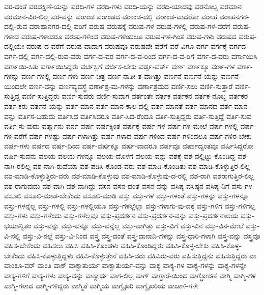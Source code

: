 {ವರ-ದಂತೆ
ವರದಕ್ಷಿಣೆ-ಯನ್ನು
ವರದಿ-ಗಳ
ವರದಿ-ಗಳು
ವರದಿ-ಯನ್ನು
ವರದಿ-ಯಾದವು
ವರನೊಬ್ಬ
ವರಮಾನ
ವರಮಾನ-ವಿರ-ಲಿಲ್ಲ
ವರ-ವನ್ನು
ವರಾಂಡ
ವರಾಂಡದ
ವರಾಂಡ-ದಲ್ಲಿ
ವರಾಂಡ-ವಾದರೋ
ವರಾಹ
ವರಾಹನಗರ-ದಲ್ಲಿ-ರುವ
ವರಾಹಾನಗರ-ದಲ್ಲಿ
ವರಿಗೆ
ವರುಷ
ವರುಷಕ್ಕೆ
ವರುಷ-ಗಳ
ವರುಷ-ಗಳಲ್ಲಿ
ವರುಷ-ಗಳ-ವರೆಗೆ
ವರುಷ-ಗಳಾದ
ವರುಷ-ಗಳಾದರೂ
ವರುಷ-ಗಳಿಂದ
ವರುಷ-ಗಳಿಂದಲೂ
ವರುಷ-ಗಳಿ-ಗಿಂತ
ವರುಷ-ಗಳು
ವರುಷದ
ವರುಷ-ದಲ್ಲಿಯೇ
ವರುಷ-ದ-ವರೆಗೆ
ವರುಷ-ವಾದಾಗ
ವರುಷವೂ
ವರುಷವೇ
ವರೆಗೆ
ವರೆ-ವಿಗೂ
ವರ್ಗ
ವರ್ಗಕ್ಕೆ
ವರ್ಗದ
ವರ್ಗ-ದಲ್ಲಿ
ವರ್ಗ-ದಲ್ಲಿ-ರುವ-ವರು
ವರ್ಗ-ದ-ವರ
ವರ್ಗ-ದ-ವ-ರಿಂದ
ವರ್ಗ-ದ-ವ-ರಿಗೆ
ವರ್ಗ-ದ-ವರು
ವರ್ಗಾಯಿಸಿ
ವರ್ಗಾಯಿ-ಸಿತು
ವರ್ಗಾಯಿಸಿದ್ದರು
ವರ್ಚಸ್ಸಿಗೆ
ವರ್ಜಿಸ-ಬೇಕು
ವರ್ಡ್ಸ-ವರ್ತ್
ವರ್ಣ
ವರ್ಣಕ್ಕೂ
ವರ್ಣ-ಗಳ
ವರ್ಣ-ಗಳನ್ನು
ವರ್ಣ-ಗಳಲ್ಲಿ
ವರ್ಣ-ಗಳು
ವರ್ಣ-ಚಿತ್ರ
ವರ್ಣ-ನಾತೀ-ತ-ವಾಗಿತ್ತು
ವರ್ಣನೆ
ವರ್ಣನೆ-ಯನ್ನು
ವರ್ಣನೆ-ಯಿಂದಲೇ
ವರ್ಣ-ವನ್ನು
ವರ್ಣವ್ಯವಸ್ಥೆ
ವರ್ಣಾಶ್ರ-ಮ-ಗಳನ್ನು
ವರ್ಣಾಶ್ರಮದ
ವರ್ಣಿ-ಸಲು
ವರ್ಣಿ-ಸುತ್ತಾರೆ
ವರ್ಣಿ-ಸುತ್ತಿದ್ದ
ವರ್ಣಿ-ಸುತ್ತಿದ್ದರು
ವರ್ಣಿ-ಸುವರು
ವರ್ಣಿ-ಸುವಾಗ
ವರ್ತಂತೇ
ವರ್ತಕ
ವರ್ತಕನ
ವರ್ತಕ-ನೊಬ್ಬ
ವರ್ತಕರ
ವರ್ತ-ಕರು
ವರ್ತನೆ-ಯನ್ನು
ವರ್ತ-ಮಾನ
ವರ್ತ-ಮಾನ-ಕಾಲ-ದಲ್ಲಿ
ವರ್ತ-ಮಾನತೆ
ವರ್ತ-ಮಾನದ
ವರ್ತ-ಮಾನ-ವನ್ನು
ವರ್ತಿಸ-ಬಹುದು
ವರ್ತಿಸಿದ
ವರ್ತಿಸಿದರೂ
ವರ್ತಿ-ಸಿದ-ರೆಂದೂ
ವರ್ತಿ-ಸುತ್ತಿದ್ದರು
ವರ್ತಿ-ಸುತ್ತಿದ್ದೆ
ವರ್ತಿ-ಸುವ
ವರ್ತಿ-ಸು-ವುದು
ವರ್ತ್ಮಾನು
ವರ್ನ
ವರ್ಷ
ವರ್ಷಕ್ಕಿಂತ
ವರ್ಷಕ್ಕೆ
ವರ್ಷ-ಗಳ
ವರ್ಷ-ಗಳ-ಮೇಲೆ
ವರ್ಷ-ಗಳಲ್ಲಿ
ವರ್ಷ-ಗಳ-ವರೆಗೆ
ವರ್ಷ-ಗಳಷ್ಟು
ವರ್ಷ-ಗಳಾಗಿತ್ತು
ವರ್ಷ-ಗಳಾದ
ವರ್ಷ-ಗಳಿಂದ
ವರ್ಷ-ಗಳಿಂದಲೂ
ವರ್ಷ-ಗಳಿರ-ಬೇಕು
ವರ್ಷ-ಗಳು
ವರ್ಷದ
ವರ್ಷ-ದಿಂದ
ವರ್ಷ-ವರ್ಷಕ್ಕೂ
ವರ್ಷ-ವಾದರೂ
ವರ್ಷವೂ
ವರ್ಷಾದ್ಯಂತವೂ
ವರ್ಷಿಸಿದ್ದರೋ
ವರ್ಷಿ-ಸುವನು
ವಲಯ
ವಲಯ-ಗಳನ್ನೂ
ವಲಯ-ದೊಳಗೆ
ವಲಯ-ವನ್ನು
ವಶಕ್ಕೆ
ವಶ-ದಲ್ಲಿಟ್ಟು-ಕೊಂಡಿದ್ದ
ವಶ-ನಾಗಿ-ರಲಿಲ್ಲ
ವಶ-ನಾಗಿ-ರುವೆಯಾ
ವಶ-ಪಡಿಸಿ-ಕೊಂಡ-ವರು
ವಶ-ಮಾಡಿ-ಕೊಂಡಿತು
ವಶ-ಮಾಡಿ-ಕೊಳ್ಳುತ್ತಿರ-ಲಿಲ್ಲ
ವಶ-ಮಾಡಿ-ಕೊಳ್ಳುತ್ತಿರು-ವರು
ವಶ-ಮಾಡಿ-ಕೊಳ್ಳುವು
ವಶ-ಮಾಡಿ-ಕೊಳ್ಳುವು-ದ-ರಲ್ಲಿ
ವಶ-ರಾಗಿ
ವಶರಾಗುತ್ತಿರ-ಲಿಲ್ಲ
ವಶ-ರಾಗುವುದು
ವಶ-ವಾಗಿ
ವಶ-ವಾಗಿದ್ದು
ವಸನ
ವಸನ-ದಂತೆ
ವಸನ-ವನ್ನು
ವಸಿಷ್ಠ
ವಸಿಷ್ಠನ
ವಸಿಷ್ಠ-ನಿಗೆ
ವಸು-ಗಳ
ವಸೂಲಿ
ವಸೂಲಿ-ಮಾಡ-ಬೇಕೆಂದು
ವಸೂಲಿ-ಮಾಡಿ
ವಸ್ತು
ವಸ್ತು-ಗಳ
ವಸ್ತು-ಗಳಂತೆ
ವಸ್ತು-ಗಳನ್ನು
ವಸ್ತು-ಗಳನ್ನೂ
ವಸ್ತು-ಗಳನ್ನೆಲ್ಲ
ವಸ್ತು-ಗಳಲ್ಲಿ
ವಸ್ತು-ಗಳಲ್ಲಿಯೂ
ವಸ್ತು-ಗಳಲ್ಲೆಲ್ಲಾ
ವಸ್ತು-ಗಳಾಗು-ವು-ದಕ್ಕೆ
ವಸ್ತು-ಗಳಿಗೆ
ವಸ್ತು-ಗಳಿಗೆಲ್ಲ
ವಸ್ತು-ಗಳು
ವಸ್ತು-ಗಳೆಂದು
ವಸ್ತು-ಗಳೆಲ್ಲವೂ
ವಸ್ತು-ಪ್ರದರ್ಶನ
ವಸ್ತು-ಪ್ರದರ್ಶನ-ವನ್ನು
ವಸ್ತು-ಪ್ರದರ್ಶನಾಲಯ
ವಸ್ತು-ಭಯಾನ್ವಿತಂ
ವಸ್ತು-ವನ್ನು
ವಸ್ತು-ವನ್ನೂ
ವಸ್ತು-ವನ್ನೆಲ್ಲ
ವಸ್ತು-ವಾಗಿತ್ತು
ವಸ್ತು-ವಿಗೆ
ವಸ್ತು-ವಿನ
ವಸ್ತು-ವಿನ-ಮೇಲೆ
ವಸ್ತು-ವಿ-ನಲ್ಲಿ
ವಸ್ತು-ವಿ-ನಲ್ಲೆ
ವಸ್ತು-ವಿ-ನಿಂದ
ವಸ್ತ್ರ
ವಸ್ತ್ರ-ದಂತೆ
ವಸ್ತ್ರ-ದಾನಾದಿ-ಗಳನ್ನು
ವಸ್ತ್ರ-ಧಾರಿ-ಗಳಾಗಿ
ವಸ್ತ್ರ-ವನ್ನು
ವಸ್ತ್ರವೂ
ವಹಿಸ-ಬೇಕೆಂದು
ವಹಿಸಲು
ವಹಿಸಿ
ವಹಿಸಿ-ಕೊಂಡಳು
ವಹಿಸಿ-ಕೊಂಡಿದ್ದರು
ವಹಿಸಿ-ಕೊಳ್ಳ-ಬೇಕು
ವಹಿಸಿ-ಕೊಳ್ಳ-ಬೇಕೆಂದು
ವಹಿಸಿ-ಕೊಳ್ಳುತ್ತಿದ್ದಳು
ವಹಿಸಿ-ಕೊಳ್ಳುತ್ತೇನೆ
ವಹಿಸಿ-ದರು
ವಹಿಸಿರು-ವರು
ವಹಿಸುತ್ತಿದ್ದನು
ವಹಿಸುತ್ತಿದ್ದರು
ವಾ
ವಾಂಕೂ-ವರ್
ವಾಂತಿ
ವಾಕ್
ವಾಕ್ಚಾತುರ್ಯ
ವಾಕ್ಚಾತುರ್ಯ-ವನ್ನು
ವಾಕ್ಯ
ವಾಕ್ಯ-ಗಳ
ವಾಕ್ಯ-ಗಳನ್ನು
ವಾಕ್ಯ-ಗಳನ್ನೇ
ವಾಕ್ಯ-ಗಳಿಗೆ
ವಾಕ್ಯ-ಗಳು
ವಾಕ್ಯ-ವನ್ನು
ವಾಕ್ಯಾರ್ಥ
ವಾಗ-ಲಿಲ್ಲ
ವಾಗ್
ವಾಗ್ಧಾರೆ-ಯಿಂದ
ವಾಗ್ಧೋರಣೆ
ವಾಗ್ಮಿ
ವಾಗ್ಮಿ-ಗಳ
ವಾಗ್ಮಿ-ಗಳಾದ
ವಾಗ್ಮಿ-ಗಳಿದ್ದರು
ವಾಗ್ಮಿತೆ
ವಾಗ್ಮಿಯ
ವಾಗ್ವೈಖರಿ
ವಾಗ್ವೈಖರಿಯ
ವಾಚಾಳಿ-ಗಳೇ
}
